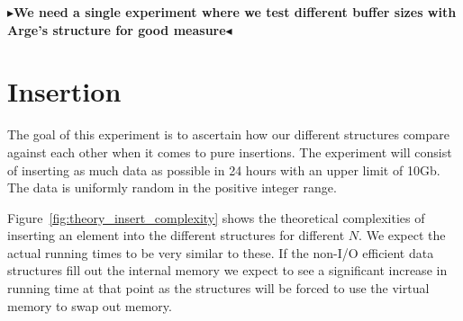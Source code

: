 \documentclass[twoside,11pt,openright]{report}
\newcommand{\todo}[1]{{\color[rgb]{.5,0,0}\textbf{$\blacktriangleright$#1$\blacktriangleleft$}}}
\begin{document}
\todo{We need a single experiment where we test different buffer sizes with Arge's structure for good measure}

\section{Insertion}
The goal of this experiment is to ascertain how our different structures compare against each other when it comes to pure insertions. The experiment will consist of inserting as much data as possible in 24 hours with an upper limit of 10Gb. The data is uniformly random in the positive integer range.

Figure~\ref{fig:theory_insert_complexity} shows the theoretical complexities of inserting an element into the different structures for different $N$. We expect the actual running times to be very similar to these. If the non-I/O efficient data structures fill out the internal memory we expect to see a significant increase in running time at that point as the structures will be forced to use the virtual memory to swap out memory.
\end{document}
